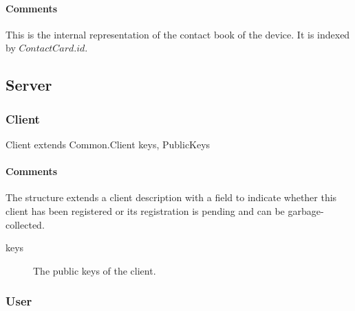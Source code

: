 \documentclass[a4paper,10pt]{article}
\begin{document}
\begin{inparaitem}[ ]
 \item \persistent
 \item \unsecure
 \item \unique
\end{inparaitem}

\paragraph*{Comments}
This is the internal representation of the contact book of the device. It is indexed by $ContactCard.id$.

\subsection{Server}
\label{sec:structure:server}

\subsubsection{Client}

\begin{verbbox}
Client extends Common.Client
{
  keys, PublicKeys
}
\end{verbbox}
\begin{center}
\theverbbox
\end{center}

\begin{inparaitem}[ ]
 \item \infrastructure
\end{inparaitem}

\paragraph*{Comments}

The structure extends a client description with a field to indicate whether this client has been registered or its registration is pending and can be garbage-collected.

\SpecialItem
\begin{description}
 \item[keys]  The public keys of the client.
\end{description}

\subsubsection{User}
\label{sec:structure:server:user}
\end{document}
